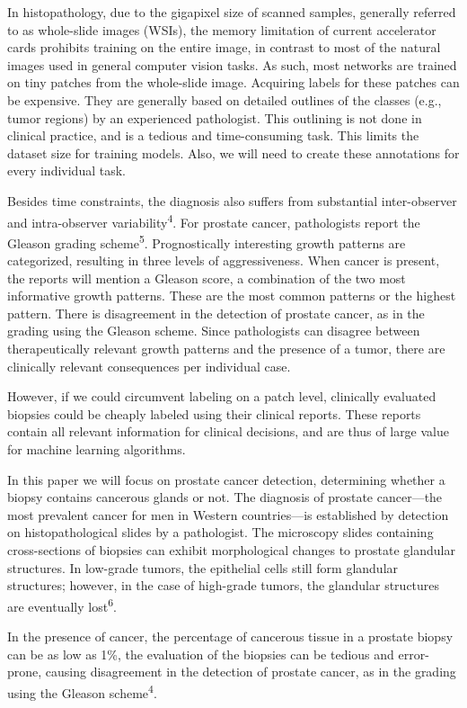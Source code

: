 \documentclass[
  12pt,
  a5,margin=2cmpaper,
]{article}
\begin{document}
In histopathology, due to the gigapixel size of scanned samples,
generally referred to as whole-slide images (WSIs), the memory
limitation of current accelerator cards prohibits training on the entire
image, in contrast to most of the natural images used in general
computer vision tasks. As such, most networks are trained on tiny
patches from the whole-slide image. Acquiring labels for these patches
can be expensive. They are generally based on detailed outlines of the
classes (e.g., tumor regions) by an experienced pathologist. This
outlining is not done in clinical practice, and is a tedious and
time-consuming task. This limits the dataset size for training models.
Also, we will need to create these annotations for every individual
task.

Besides time constraints, the diagnosis also suffers from substantial
inter-observer and intra-observer variability\textsuperscript{4}. For
prostate cancer, pathologists report the Gleason grading
scheme\textsuperscript{5}. Prognostically interesting growth patterns
are categorized, resulting in three levels of aggressiveness. When
cancer is present, the reports will mention a Gleason score, a
combination of the two most informative growth patterns. These are the
most common patterns or the highest pattern. There is disagreement in
the detection of prostate cancer, as in the grading using the Gleason
scheme. Since pathologists can disagree between therapeutically relevant
growth patterns and the presence of a tumor, there are clinically
relevant consequences per individual case.

However, if we could circumvent labeling on a patch level, clinically
evaluated biopsies could be cheaply labeled using their clinical
reports. These reports contain all relevant information for clinical
decisions, and are thus of large value for machine learning algorithms.

In this paper we will focus on prostate cancer detection, determining
whether a biopsy contains cancerous glands or not. The diagnosis of
prostate cancer---the most prevalent cancer for men in Western
countries---is established by detection on histopathological slides by a
pathologist. The microscopy slides containing cross-sections of biopsies
can exhibit morphological changes to prostate glandular structures. In
low-grade tumors, the epithelial cells still form glandular structures;
however, in the case of high-grade tumors, the glandular structures are
eventually lost\textsuperscript{6}.

In the presence of cancer, the percentage of cancerous tissue in a
prostate biopsy can be as low as 1\%, the evaluation of the biopsies can
be tedious and error-prone, causing disagreement in the detection of
prostate cancer, as in the grading using the Gleason
scheme\textsuperscript{4}.
\end{document}
